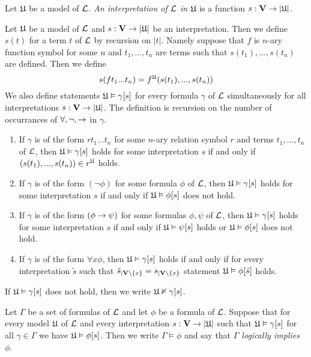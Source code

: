\begin{definition}
Let ${\mathfrak U}$ be a model of ${\mathcal L}$. \textit{An interpretation of ${\mathcal L}$ in ${\mathfrak U}$} is a function $s:\mathbf{V}\rightarrow |{\mathfrak U}|$.
\end{definition}
\noindent
Let ${\mathfrak U}$ be a model of ${\mathcal L}$ and $s:\mathbf{V}\rightarrow |{\mathfrak U}|$ be an interpretation. Then we define $s(t)$ for a term $t$ of ${\mathcal L}$ by recursion on $|t|$. Namely suppose that $f$ is $n$-ary function symbol for some $n$ and $t_1, ..., t_n$ are terms such that $s(t_1),...,s(t_n)$ are defined. Then we define
$$s(ft_1...t_n)= f^{{\mathfrak U}}(s(t_1),...,s(t_n))$$
We also define statements ${\mathfrak U} \vDash \gamma[s]$ for every formula $\gamma$ of ${\mathcal L}$ simultaneously for all interpretations $s:\mathbf{V} \rightarrow |{\mathfrak U}|$. The definition is recursion on the number of occurrances of $\forall, \neg, \rightarrow$ in $\gamma$.
\begin{enumerate}[label=\textbf{(\arabic*)}, leftmargin=3.0em]
\item If $\gamma$ is of the form $rt_1 ...t_n$ for some $n$-ary relation symbol $r$ and terms $t_1,...,t_n$ of ${\mathcal L}$, then ${\mathfrak U} \vDash \gamma[s]$ holds for some interpretation $s$ if and only if $\left(s(t_1),...,s(t_n)\right) \in r^{\mathfrak U}$ holds.
\item If $\gamma$ is of the form $(\neg \phi)$ for some formula $\phi$ of ${\mathcal L}$, then ${\mathfrak U} \vDash \gamma[s]$ holds for some interpretation $s$ if and only if ${\mathfrak U} \vDash \phi[s]$ does not hold.
\item If $\gamma$ is of the form $(\phi \rightarrow \psi)$ for some formulas $\phi, \psi$ of ${\mathcal L}$, then ${\mathfrak U} \vDash \gamma[s]$ holds for some interpretation $s$ if and only if ${\mathfrak U} \vDash \psi[s]$ holds or ${\mathfrak U} \vDash \phi[s]$ does not hold.
\item If $\gamma$ is of the form $\forall x \phi$, then ${\mathfrak U} \vDash \gamma[s]$ holds if and only if for every interpretation $\tilde{s}$ such that $\tilde{s}_{\mid \mathbf{V}\setminus \{x\}} = s_{\mid \mathbf{V}\setminus \{x\}}$ statement ${\mathfrak U} \vDash \phi[\tilde{s}]$ holds.
\end{enumerate}
If ${\mathfrak U} \vDash \gamma[s]$ does not hold, then we write ${\mathfrak U} \nvDash \gamma[s]$.

\begin{definition}
Let $\Gamma$ be a set of formulas of ${\mathcal L}$ and let $\phi$ be a formula of ${\mathcal L}$. Suppose that for every model ${\mathfrak U}$ of ${\mathcal L}$ and every interpretation $s:\mathbf{V} \rightarrow |{\mathfrak U}|$ such that ${\mathfrak U} \vDash \gamma[s]$ for all $\gamma \in \Gamma$ we have ${\mathfrak U} \vDash \phi[s]$. Then we write $\Gamma \vDash \phi$ and say that \textit{$\Gamma$ logically implies $\phi$}.
\end{definition}

